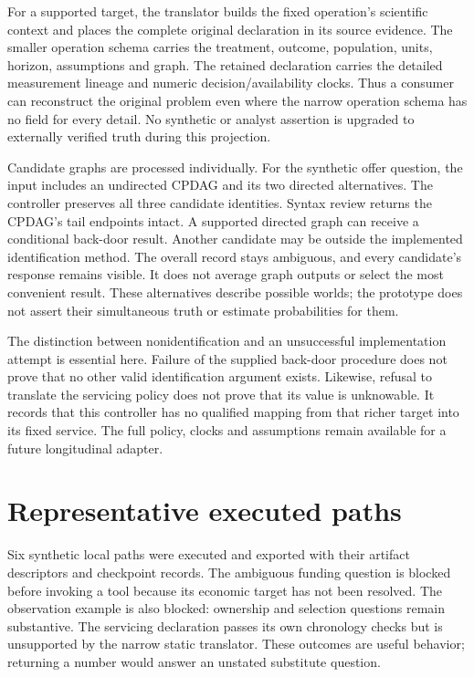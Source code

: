 For a supported target, the translator builds the fixed operation's scientific
context and places the complete original declaration in its source evidence.
The smaller operation schema carries the treatment, outcome, population, units,
horizon, assumptions and graph. The retained declaration carries the detailed
measurement lineage and numeric decision/availability clocks. Thus a consumer
can reconstruct the original problem even where the narrow operation schema
has no field for every detail. No synthetic or analyst assertion is upgraded to
externally verified truth during this projection.

Candidate graphs are processed individually. For the synthetic offer question,
the input includes an undirected CPDAG and its two directed alternatives. The
controller preserves all three candidate identities. Syntax review returns the
CPDAG's tail endpoints intact. A supported directed graph can receive a
conditional back-door result. Another candidate may be outside the implemented
identification method. The overall record stays ambiguous, and every candidate's
response remains visible. It does not average graph outputs or select the most
convenient result. These alternatives describe possible worlds; the prototype
does not assert their simultaneous truth or estimate probabilities for them.

The distinction between nonidentification and an unsuccessful implementation
attempt is essential here. Failure of the supplied back-door procedure does
not prove that no other valid identification argument exists. Likewise, refusal
to translate the servicing policy does not prove that its value is unknowable.
It records that this controller has no qualified mapping from that richer
target into its fixed service. The full policy, clocks and assumptions remain
available for a future longitudinal adapter.

\section{Representative executed paths}

Six synthetic local paths were executed and exported with their artifact
descriptors and checkpoint records. The ambiguous funding question is blocked
before invoking a tool because its economic target has not been resolved. The
observation example is also blocked: ownership and selection questions remain
substantive. The servicing declaration passes its own chronology checks but is
unsupported by the narrow static translator. These outcomes are useful behavior;
returning a number would answer an unstated substitute question.

